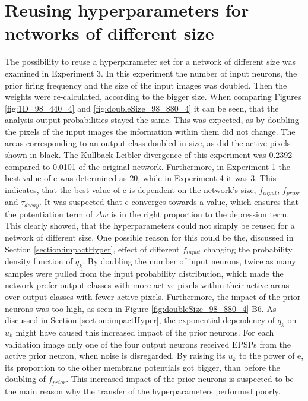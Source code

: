 \section{Reusing hyperparameters for networks of different size}
The possibility to reuse a hyperparameter set for a network of different size was examined in Experiment 3. In this experiment the number of input neurons, the prior firing frequency and the size of the input images was doubled. Then the weights were re-calculated, according to the bigger size. When comparing Figures \ref{fig:1D_98_440_4} and \ref{fig:doubleSize_98_880_4} it can be seen, that the analysis output probabilities stayed the same. This was expected, as by doubling the pixels of the input images the information within them did not change. The areas corresponding to an output class doubled in size, as did the active pixels shown in black. The Kullback-Leibler divergence of this experiment was 0.2392 compared to 0.0101 of the original network. 
Furthermore, in Experiment 1 the best value of c was determined as 20, while in Experiment 4 it was 3. This indicates, that the best value of c is dependent on the network's size, $f_{input}$, $f_{prior}$ and $\tau_{decay}$. It was suspected that c converges towards a value, which ensures that the potentiation term of $\Delta w$ is in the right proportion to the depression term.
This clearly showed, that the hyperparameters could not simply be reused for a network of different size. One possible reason for this could be the, discussed in Section \ref{section:impactHyper}, effect of different $f_{input}$ changing the probability density function of $q_k$. By doubling the number of input neurons, twice as many samples were pulled from the input probability distribution, which made the network prefer output classes with more active pixels within their active areas over output classes with fewer active pixels. Furthermore, the impact of the prior neurons was too high, as seen in Figure \ref{fig:doubleSize_98_880_4} B6. As discussed in Section \ref{section:impactHyper}, the exponential dependency of $q_k$ on $u_k$ might have caused this increased impact of the prior neurons. For each validation image only one of the four output neurons received EPSPs from the active prior neuron, when noise is disregarded. By raising its $u_k$ to the power of e, its proportion to the other membrane potentials got bigger, than before the doubling of $f_{prior}$. This increased impact of the prior neurons is suspected to be the main reason why the transfer of the hyperparameters performed poorly.

